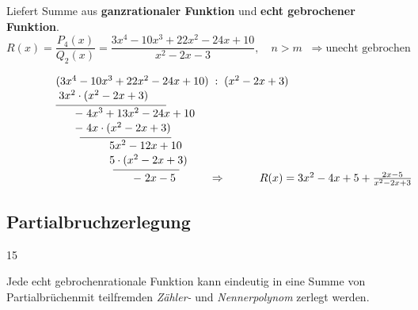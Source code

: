 Liefert Summe aus \textbf{ganzrationaler Funktion} und \textbf{echt gebrochener Funktion}.
\[
R(x) = \frac{P_4(x)}{Q_2(x)} = \frac{3x^4 - 10x^3 + 22x^2 - 24x + 10}{x^2 - 2x - 3}, \quad n > m \;\; \Rightarrow \text{unecht gebrochen}
\]

\[
\makebox[270pt][l]{%
\begin{tabular}{@{}l@{}}
$(3x^4 - 10x^3 + 22x^2 - 24x + 10) \; : \; (x^2 - 2x + 3)$ \\[1pt]

$\;3x^2 \cdot (x^2 - 2x + 3)$ \\[-6pt]
\rule{3.5cm}{0.4pt} \\[-2pt]

\hspace*{0.6cm}$-\;4x^3 + 13x^2 - 24x + 10$ \\[1pt]

\hspace*{0.6cm}$-\; 4x \cdot (x^2 - 2x + 3)$ \\[-6pt]
\quad \quad \,\rule{2.9cm}{0.4pt} \\[-2pt]

\hspace*{1.7cm}$5x^2 - 12x + 10$ \\[1pt]

\hspace*{1.7cm}$5 \cdot (x^2 - 2x + 3)$ \\[-6pt]
\quad \quad \quad \quad \quad \,\rule{2.1cm}{0.4pt} \\[-2pt]

\hspace*{2.45cm}$-\;2x - 5 \quad \quad \quad\Rightarrow \quad \quad \quad R(x) = 3x^2 - 4x + 5 + \frac{2x - 5}{x^2 - 2x + 3}$ \\[1pt]
\end{tabular}}
\]

\subsection{Partialbruchzerlegung}{15}

Jede echt gebrochenrationale Funktion kann eindeutig in eine Summe von Partialbrüchenmit teilfremden \textit{Zähler-} und \textit{Nennerpolynom} zerlegt werden.
\vspace{0.1cm}

